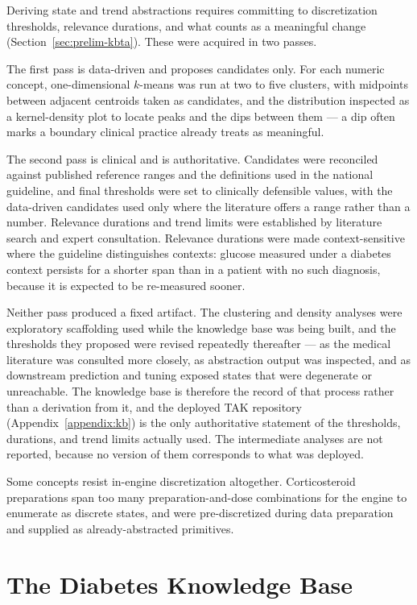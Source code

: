 Deriving state and trend abstractions requires committing to discretization thresholds, relevance durations, and what counts as a meaningful change (Section~\ref{sec:prelim-kbta}). These were acquired in two passes.

The first pass is data-driven and proposes candidates only. For each numeric concept, one-dimensional $k$-means was run at two to five clusters, with midpoints between adjacent centroids taken as candidates, and the distribution inspected as a kernel-density plot to locate peaks and the dips between them --- a dip often marks a boundary clinical practice already treats as meaningful.

The second pass is clinical and is authoritative. Candidates were reconciled against published reference ranges and the definitions used in the national guideline, and final thresholds were set to clinically defensible values, with the data-driven candidates used only where the literature offers a range rather than a number. Relevance durations and trend limits were established by literature search and expert consultation. Relevance durations were made context-sensitive where the guideline distinguishes contexts: glucose measured under a diabetes context persists for a shorter span than in a patient with no such diagnosis, because it is expected to be re-measured sooner.

Neither pass produced a fixed artifact. The clustering and density analyses were exploratory scaffolding used while the knowledge base was being built, and the thresholds they proposed were revised repeatedly thereafter --- as the medical literature was consulted more closely, as abstraction output was inspected, and as downstream prediction and tuning exposed states that were degenerate or unreachable. The knowledge base is therefore the record of that process rather than a derivation from it, and the deployed TAK repository (Appendix~\ref{appendix:kb}) is the only authoritative statement of the thresholds, durations, and trend limits actually used. The intermediate analyses are not reported, because no version of them corresponds to what was deployed.

Some concepts resist in-engine discretization altogether. Corticosteroid preparations span too many preparation-and-dose combinations for the engine to enumerate as discrete states, and were pre-discretized during data preparation and supplied as already-abstracted primitives.

\section{The Diabetes Knowledge Base}


